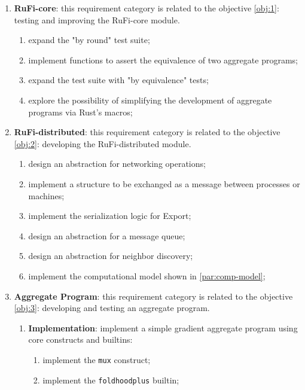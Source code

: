 \begin{enumerate}
    \item \textbf{RuFi-core}: this requirement category is related to the objective \ref{obj:1}: testing and improving the RuFi-core module.
          \begin{enumerate}
              \item expand the "by round" test suite;
              \item implement functions to assert the equivalence of two aggregate programs;
              \item expand the test suite with "by equivalence" tests;
              \item explore the possibility of simplifying the development of aggregate programs via Rust's macros;
          \end{enumerate}
    \item \textbf{RuFi-distributed}: this requirement category is related to the objective \ref{obj:2}: developing the RuFi-distributed module.
          \begin{enumerate}
              \item design an abstraction for networking operations;
              \item implement a structure to be exchanged as a message between processes or machines;
              \item implement the serialization logic for Export;
              \item design an abstraction for a message queue;
              \item design an abstraction for neighbor discovery;
              \item implement the computational model shown in \ref{par:comp-model};
          \end{enumerate}
    \item \textbf{Aggregate Program}: this requirement category is related to the objective \ref{obj:3}: developing and testing an aggregate program.
          \begin{enumerate}
              \item \textbf{Implementation}: implement a simple gradient aggregate program using core constructs and builtins:
                    \begin{enumerate}
                        \item implement the \texttt{mux} construct;
                        \item implement the \texttt{foldhoodplus} builtin;

\end{enumerate}
\end{enumerate}
\end{enumerate}
